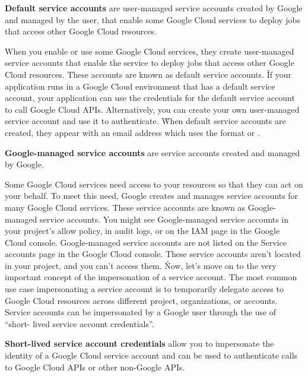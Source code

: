 \textbf{Default service accounts} are user-managed service accounts created by Google and managed by the user, that
enable some Google Cloud services to deploy jobs that access other Google Cloud resources.
\ed

When you enable or use some Google Cloud services, they create user-managed service accounts that enable the service
to deploy jobs that access other Google Cloud resources. These accounts are known as default service accounts. \v

If your application runs in a Google Cloud environment that has a default service account, your application can use
the credentials for the default service account to call Google Cloud APIs. Alternatively, you can create your own
user-managed service account and use it to authenticate. \v

When default service accounts are created, they appear with an email address which uses the format
 or .

\textbf{Google-managed service accounts} are service accounts created and managed by Google.
\ed

Some Google Cloud services need access to your resources so that they can act on your behalf. To meet this need,
Google creates and manages service accounts for many Google Cloud services. These service accounts are known as
Google-managed service accounts. You might see Google-managed service accounts in your project's allow policy, in
audit logs, or on the IAM page in the Google Cloud console. Google-managed service accounts are not listed on the
Service accounts page in the Google Cloud console. These service accounts aren't located in your project, and you can't
access them. \v

Now, let's move on to the very important concept of the impersonation of a service account. The most common use case
impersonating a service account is to temporarily delegate access to Google Cloud resources across different project,
organizations, or accounts. Service accounts can be impersonated by a Google user through the use of ``short-
lived service account credentials''.

\textbf{Short-lived service account credentials} allow you to impersonate the identity of a Google Cloud service
account and can be used to authenticate calls to Google Cloud APIs or other non-Google APIs.
\ed

